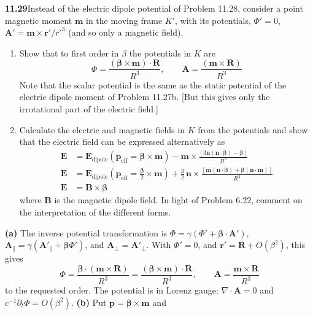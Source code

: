\par\bigskip
\noindent\textbf{11.29}\quad Instead of the electric dipole potential of Problem 11.28, consider a point magnetic moment $\mathbf{m}$ in the moving frame $K'$, with its potentials, $\Phi'=0$, $\mathbf{A}'=\mathbf{m}\times\mathbf{r}'/r'^{3}$ (and so only a magnetic field).
\begin{enumerate}
\item[(a)] Show that to first order in $\beta$ the potentials in $K$ are
\[
\Phi=\frac{(\boldsymbol{\beta}\times\mathbf{m})\cdot\mathbf{R}}{R^{3}},\qquad
\mathbf{A}=\frac{(\mathbf{m}\times\mathbf{R})}{R^{3}}
\]
Note that the scalar potential is the same as the static potential of the electric dipole moment of Problem 11.27b. [But this gives only the irrotational part of the electric field.]
\item[(b)] Calculate the electric and magnetic fields in $K$ from the potentials and show that the electric field can be expressed alternatively as
\begin{align*}
\mathbf{E}&=\mathbf{E}_{\mathrm{dipole}}(\mathbf{p}_{\mathrm{eff}}=\boldsymbol{\beta}\times\mathbf{m})-\mathbf{m}\times\frac{[3\mathbf{n}(\mathbf{n}\cdot\boldsymbol{\beta})-\boldsymbol{\beta}]}{R^{3}}\\[6pt]
\mathbf{E}&=\mathbf{E}_{\mathrm{dipole}}\!\left(\mathbf{p}_{\mathrm{eff}}=\frac{\boldsymbol{\beta}}{2}\times\mathbf{m}\right)+\frac{3}{2}\,\mathbf{n}\times\frac{[\mathbf{m}(\mathbf{n}\cdot\boldsymbol{\beta})+\boldsymbol{\beta}(\mathbf{n}\cdot\mathbf{m})]}{R^{3}}\\[6pt]
\mathbf{E}&=\mathbf{B}\times\boldsymbol{\beta}
\end{align*}
where $\mathbf{B}$ is the magnetic dipole field. In light of Problem 6.22, comment on the interpretation of the different forms.
\end{enumerate}
\solution
\textbf{(a)} The inverse potential transformation is
$\Phi=\gamma(\Phi'+\boldsymbol\beta\cdot\mathbf A')$,
$\mathbf A_\parallel=\gamma(\mathbf A'_\parallel+
\boldsymbol\beta\Phi')$, and $\mathbf A_\perp=\mathbf A'_\perp$.
With $\Phi'=0$, and $\mathbf r'=\mathbf R+O(\beta^2)$, this gives
\[
\Phi=\frac{\boldsymbol\beta\cdot(\mathbf m\times\mathbf R)}{R^3}
=\boxed{\frac{(\boldsymbol\beta\times\mathbf m)\cdot\mathbf R}{R^3}},
\qquad\boxed{\mathbf A=\frac{\mathbf m\times\mathbf R}{R^3}}
\]
to the requested order. The potential is in Lorenz gauge:
$\nabla\cdot\mathbf A=0$ and $c^{-1}\partial_t\Phi=O(\beta^2)$.
\textbf{(b)} Put $\mathbf p=\boldsymbol\beta\times\mathbf m$ and

